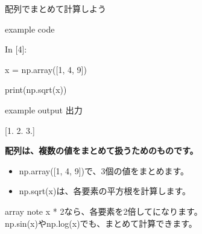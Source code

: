 \documentclass[12pt,aspectratio=43]{beamer}
\newcommand{\pythonexample}[4]{%
  \begin{beamercolorbox}[wd=\linewidth,sep=1.8mm]{example code}
    {\codefont\fontsize{9}{10}\selectfont\textcolor{courseblue}{In [#1]:}\par}
    \begingroup\codefont\fontsize{16}{18}\selectfont
      \strut#2\\
      \strut#3\par
    \endgroup
  \end{beamercolorbox}\par
  \begin{beamercolorbox}[wd=\linewidth,sep=.5mm,leftskip=1.3mm]{example output}
    {\fontsize{9}{11}\selectfont\textcolor{black!65}{出力}}\quad
    {\codefont\fontsize{16}{18}\selectfont\strut#4}
  \end{beamercolorbox}}
\begin{document}
\begin{frame}[t]{配列でまとめて計算しよう}
  \setlength{\parskip}{0pt}
  \pythonexample{4}
    {x = np.\textcolor{codebuiltin}{array}([\textcolor{codevalue}{1}, \textcolor{codevalue}{4}, \textcolor{codevalue}{9}])}
    {\textcolor{codebuiltin}{print}(np.\textcolor{codebuiltin}{sqrt}(x))}{[1. 2. 3.]}
  \par\vspace{1mm}
  \textbf{配列は、複数の値をまとめて扱うためのものです。}
  \par
  \begin{itemize}
    \setlength{\itemsep}{1mm}
    \item {\codefont np.array([1, 4, 9])}で、3個の値をまとめます。
    \item {\codefont np.sqrt(x)}は、各要素の平方根を計算します。
  \end{itemize}
  \vspace{1mm}
  \begin{beamercolorbox}[wd=\textwidth,sep=1.5mm]{array note}
    \small {\codefont x * 2}なら、各要素を2倍して{\codefont [2 8 18]}になります。\\
    {\codefont np.sin(x)}や{\codefont np.log(x)}でも、まとめて計算できます。
  \end{beamercolorbox}
\end{frame}
\end{document}
